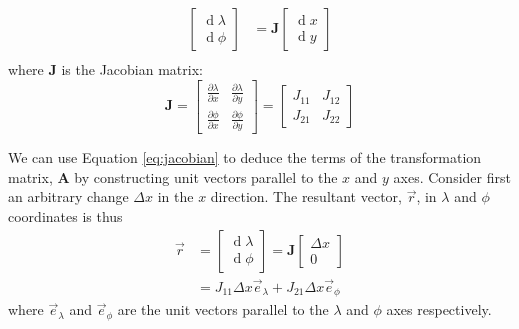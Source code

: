 \documentclass[a4paper,10pt]{article}
\begin{document}
\begin{equation}\label{eq:jacobian}\begin{aligned}
 \left[\begin{matrix}
  \operatorname d \lambda \\ \operatorname d \phi 
  \end{matrix}\right]
&= \mathbf{J}  \left[\begin{matrix}
  \operatorname dx  \\  \operatorname dy  
  \end{matrix}\right] \\
\end{aligned}\end{equation}
where $\mathbf{J}$ is the Jacobian matrix:
\begin{equation}\label{eq:jacobian_defn}
\mathbf{J}=\left[\begin{matrix}
   \frac {\partial \lambda}{\partial x}
& \frac {\partial \lambda}{\partial y}
\\  \frac {\partial \phi}{\partial x}
&  \frac {\partial \phi}{\partial y}
\end{matrix}\right]
=\left[\begin{matrix}J_{11} & J_{12} \\ J_{21} & J_{22}  \end{matrix}\right]  
\end{equation}
 
We can use Equation \eqref{eq:jacobian} to deduce the terms of the transformation matrix, $\mathbf A$ by constructing unit vectors parallel to the $x$ and $y$ axes. Consider first an arbitrary change $\Delta x$ in the $x$ direction. The resultant vector,  $\vec{r}$, in $\lambda$ and $\phi$ coordinates is thus
\begin{equation}\begin{aligned}
 \vec{r} &= \left[\begin{matrix}
  \operatorname d \lambda \\ \operatorname d \phi 
  \end{matrix}\right]
  = \mathbf{J}
  \left[\begin{matrix} \Delta x \\  0 \end{matrix}\right] \\
&=J_{11}\Delta x \vec e_\lambda + J_{21} \Delta x \vec e_\phi
\end{aligned}
\end{equation}
where $\vec e_\lambda$ and $\vec e_\phi$ are the unit vectors parallel to the $\lambda$ and $\phi$ axes respectively.
\end{document}

